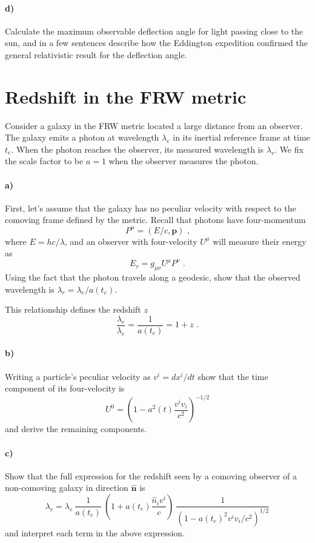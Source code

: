 \documentclass[12pt]{article}
\begin{document}
\paragraph{d)} Calculate the maximum observable deflection angle for light passing close to the sun, and in a few sentences describe how the Eddington expedition confirmed the general relativistic result for the deflection angle.

\section{Redshift in the FRW metric}

Consider a galaxy in the FRW metric located a large distance from an observer.
The galaxy emits a photon at wavelength $\lambda_e$ in its inertial reference
frame at time $t_e$. When the photon reaches the observer, its measured
wavelength is $\lambda_{r}$. We fix the scale factor to be $a=1$ when the
observer measures the photon.

\paragraph{a)} First, let's assume that the galaxy has no peculiar velocity with
respect to the comoving frame defined by the metric. Recall that photons have
four-momentum
\begin{equation}
    P^\mu = \left(E / c, \mathbf{p}\right) \text{ ,}
\end{equation}
where $E = hc / \lambda$, and an observer with four-velocity $U^\mu$ will
measure their energy as
\begin{equation}
    E_r = g_{\mu \nu} U^\mu P^\nu \text{ .}
\end{equation}
Using the fact that the photon travels along a
geodesic, show that the observed wavelength is $\lambda_{r} = \lambda_e /
a(t_e)$.

This relationship defines the redshift $z$
\begin{equation}
    \frac{\lambda_{r}}{\lambda_e} = \frac{1}{a(t_e)} = 1 + z \text{ .}
\end{equation}

\paragraph{b)} Writing a particle's peculiar velocity as $v^i = d x^i / dt$ show that the time component of its four-velocity is
\begin{equation}
    U^0 = \left(1 - a^2(t) \frac{v^i v_i}{c^2}\right)^{-1/2}
\end{equation}
and derive the remaining components.

\paragraph{c)} Show that the full expression for the redshift seen by a comoving observer of a non-comoving galaxy in direction $\hat{\mathbf{n}}$ is
\begin{equation}
    \lambda_r = \lambda_e \: \frac{1}{a(t_e)} \: \left(1 + a(t_e) \frac{\hat{n}_i v^i}{c} \right) \: \frac{1}{\left(1 - a(t_e)^2 v^i v_i / c^2\right)^{1/2}}
\end{equation}
and interpret each term in the above expression.
\end{document}
